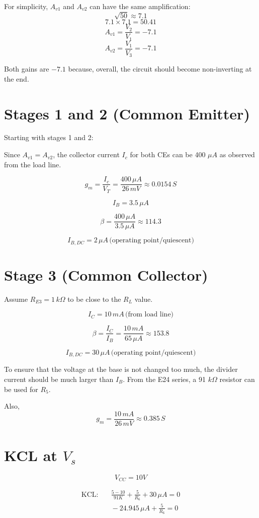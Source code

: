 For simplicity, \( A_{v1} \) and \( A_{v2} \) can have the same amplification:
\[
\sqrt{50} \approx 7.1
\]
\[
7.1 \times 7.1 = 50.41
\]
\[
A_{v1} = \frac{V_2}{V_1} = -7.1
\]
\[
A_{v2} = \frac{V_1}{V_3} = -7.1
\]

Both gains are \(-7.1\) because, overall, the circuit should become non-inverting at the end.

\section{Stages 1 and 2 (Common Emitter)}
Starting with stages 1 and 2:

Since \( A_{v1} = A_{v2} \), the collector current \( I_c \) for both CEs can be 400 \(\mu A\) as observed from the load line.

\[
g_m = \frac{I_c}{V_T} = \frac{400 \, \mu A}{26 \, mV} \approx 0.0154 \, S
\]

\[
I_B = 3.5 \, \mu A
\]

\[
\beta = \frac{400 \, \mu A}{3.5 \, \mu A} \approx 114.3
\]

\[
I_{B,DC} = 2 \, \mu A \, \text{(operating point/quiescent)}
\]

\section{Stage 3 (Common Collector)}
Assume \( R_{E3} = 1 \, k\Omega \) to be close to the \( R_L \) value.

\[
I_C = 10 \, mA \, \text{(from load line)}
\]

\[
\beta = \frac{I_C}{I_B} = \frac{10 \, mA}{65 \, \mu A} \approx 153.8
\]

\[
I_{B,DC} = 30 \, \mu A \, \text{(operating point/quiescent)}
\]

To ensure that the voltage at the base is not changed too much, the divider current should be much larger than \( I_B \). From the E24 series, a 91 \( k\Omega \) resistor can be used for \( R_5 \).

Also,
\[
g_m = \frac{10 \, mA}{26 \, mV} \approx 0.385 \, S
\]

\section{KCL at \(V_s\)}
\[
V_{CC} = 10V
\]

\begin{align*}
\text{KCL:} & \quad \frac{5 - 10}{91K} + \frac{5}{R_6} + 30 \, \mu A = 0 \\
            & \quad -24.945 \, \mu A + \frac{5}{R_6} = 0
\end{align*}

